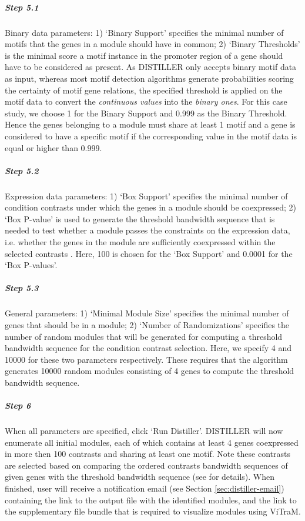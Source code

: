 \begin{small}
\subparagraph{Step 5.1} Binary data parameters: 1) `Binary Support' specifies 
the minimal number of motifs that the genes in a module should have in common;
2) `Binary Thresholds' is the minimal score a motif instance in the promoter
region of a gene should have to be considered as present.  
%
As DISTILLER only accepts binary motif data as input, whereas most motif
detection algorithms generate probabilities scoring the certainty of motif
gene relations, the specified threshold is applied on the motif data to
convert the \textit{continuous values} into the \textit{binary ones}.
%
For this case study, we choose 1 for the Binary Support and 
0.999 as the Binary Threshold. Hence the genes belonging to a module must share 
at least 1 motif and a gene is considered to have a specific motif if the 
corresponding value in the motif data is equal or higher than 0.999.

\subparagraph{Step 5.2}	Expression data parameters: 1) `Box Support' specifies 
the minimal number of condition contrasts under which the genes in a module
should be coexpressed; 2) `Box P-value' is used to generate the threshold
bandwidth sequence that is needed to test whether a module passes the
constraints on the expression data, i.e. whether the genes in the module are
sufficiently coexpressed within the selected contrasts \cite{Lemmens2009}.
Here, 100 is chosen for the `Box Support' and 0.0001 for the `Box P-values'.

\subparagraph{Step 5.3} General parameters: 1) `Minimal Module Size' specifies 
the minimal number of genes that should be in a module; 2) `Number of
Randomizations' specifies the number of random modules that will be generated
for computing a threshold bandwidth sequence for the condition contrast
selection.  Here, we specify 4 and 10000 for these two parameters
respectively.
These requires that the algorithm generates 10000 random modules consisting of
4 genes to compute the threshold bandwidth sequence.

\subparagraph{Step 6} When all parameters are specified, click `Run 
Distiller'. DISTILLER will now enumerate all initial modules, each of which
contains at least 4 genes coexpressed in more then 100 contrasts and sharing
at least one motif. Note these contrasts are selected based on comparing the
ordered contrasts bandwidth sequences of given genes with the threshold
bandwidth sequence (see \cite{Lemmens2009} for details).
%
When finished, user will receive a notification email (see Section 
\ref{sec:distiller-email}) containing the link to the output file with the
identified modules, and the link to the supplementary file bundle that is 
required to visualize modules using ViTraM.

\end{small} %


